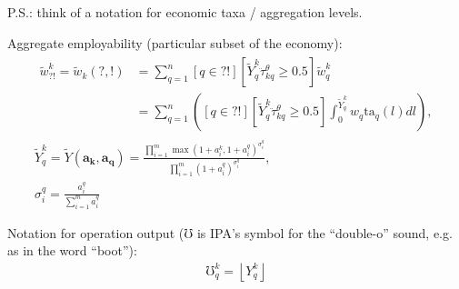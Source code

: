 \documentclass[hidelinks, nonatbib]{elsarticle}
\begin{document}
P.S.: think of a notation for economic taxa / aggregation levels.

Aggregate employability (particular subset of the economy):
\begin{gather}
    \begin{align}
        \tilde{w}_{?!}^{k} =
        \tilde{w}_{k}(?, !)
        &=
        \sum_{q=1}^{n}{
            [q \in ?!]
            [
                \tilde{Y}_{q}^{k}
                \ddot{\tau}_{kq}^{\theta}
                \geq 0.5
            ]
            \tilde{w}_{q}^{k}
        }
        \\
        &=
        \sum_{q=1}^{n}{
            \left(
                [q \in ?!]
                [
                \tilde{Y}_{q}^{k}
                \ddot{\tau}_{kq}^{\theta}
                \geq 0.5
                ]
                \int_{0}^{\tilde{Y}_{q}^{k}}{
                    w_q
                    \text{ta}_q(l)
                    dl
                }
            \right)
        }
        ,
    \end{align}
    \\
    \tilde{Y}_{q}^{k} = 
    \tilde{Y}(
        \boldsymbol{a_k},
        \boldsymbol{a_q}
        ) =
        \frac{
            \prod_{i=1}^{m}{
                {
                    \max(
                        1 + a_{i}^{k},
                        1 + a_{i}^{q}
                    )
                } ^ {
                    \sigma_{i}^{q}
                }
            }
        }{
            \prod_{i=1}^{m}{
                {
                    (
                        1 + a_{i}^{q}
                    )
                } ^ {
                    \sigma_{i}^{q}
                }
            }
        }
        ,\\
        \sigma_{i}^{q} = 
        \frac{
            a_{i}^{q}
        }{
            \sum_{i=1}^{m}{
                a_{i}^{q}
            }
        }
\end{gather}

Notation for operation output ($\mho$ is IPA's symbol for the ``double-o'' sound, e.g. as in the word ``boot''):
\begin{gather}
    \mho_{q}^{k} = 
    \left\lfloor 
        {Y}_{q}^{k}
    \right\rfloor
\end{gather}
\end{document}
